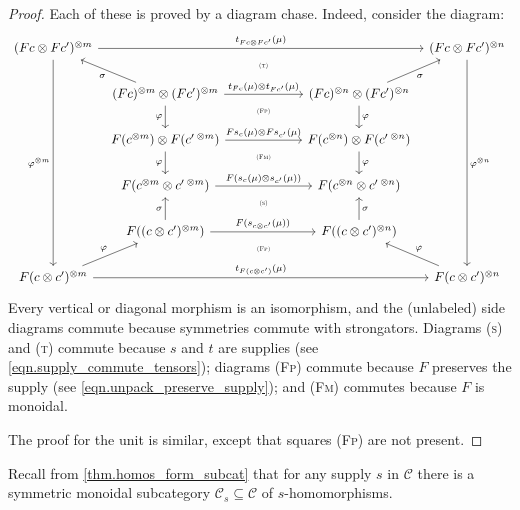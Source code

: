 \documentclass[11pt, oneside, article]{memoir}
\theoremstyle{plain}
\theoremstyle{definition}
\theoremstyle{remark}
\newcommand{\cat}[1]{\mathcal{#1}}%
\newcommand{\tpow}[1]{^{\otimes #1}}
\renewcommand{\ss}{\subseteq}
\begin{document}
\begin{proof}
Each of these is proved by a diagram chase. Indeed, consider the diagram:
\[
\begin{tikzcd}[column sep=6pt]
	(Fc\otimes Fc')\tpow{m}
		\ar[rrrr, "t_{Fc\otimes Fc'}(\mu)"]
		\ar[ddddd, "\varphi\tpow{m}"']
		\ar[from=dr, "\sigma"]&&[18pt]
		\ar[d, phantom, near start,  "\textsc{\tiny (t)}"]&[18pt]&
	(Fc\otimes Fc')\tpow{n}
		\ar[ddddd, "\varphi\tpow{n}"]
		\ar[from=dl, "\sigma"']\\&
	(Fc)\tpow{m}\otimes(Fc')\tpow{m}
		\ar[d, "\varphi"']
		\ar[rr, "t_{Fc}(\mu)\otimes t_{Fc'}(\mu)"]&
		\ar[d, phantom, near start, "\textsc{\tiny (Fp)}"]&
	(Fc)\tpow{n}\otimes(Fc')\tpow{n}
		\ar[d, "\varphi"]\\&
	F(c\tpow{m})\otimes F(c'\,\tpow{m})
		\ar[rr, "Fs_c(\mu)\otimes Fs_{c'}(\mu)"]
		\ar[d, "\varphi"']&
		\ar[d, phantom, near start, "\textsc{\tiny (Fm)}"]&
	F(c\tpow{n})\otimes F(c'\,\tpow{n})
		\ar[d, "\varphi"]\\&
	F(c\tpow{m}\otimes c'\,\tpow{m})
		\ar[rr, "F(s_c(\mu)\otimes s_{c'}(\mu))"]&
		\ar[d, phantom, near start, "\textsc{\tiny (s)}"]&
	F(c\tpow{n}\otimes c'\,\tpow{n})\\&
	F((c\otimes c')\tpow{m})
		\ar[u, "\sigma"]
		\ar[rr, "F(s_{c\otimes c'}(\mu))"]&
		\ar[d, phantom, near start, "\textsc{\tiny (Fp)}"]&
	F((c\otimes c')\tpow{n})
		\ar[u, "\sigma"']\\
	F(c\otimes c')\tpow{m}
		\ar[rrrr, "t_{F(c\otimes c')}(\mu)"]
		\ar[ur, "\varphi"]&&~&&
	F(c\otimes c')\tpow{n}
		\ar[ul, "\varphi"']
\end{tikzcd}
\]
Every vertical or diagonal morphism is an isomorphism, and the (unlabeled) side diagrams commute because symmetries commute with strongators. Diagrams \textsc{(s)} and \textsc{(t)} commute because $s$ and $t$ are supplies (see \cref{eqn.supply_commute_tensors}); diagrams \textsc{(Fp)} commute because $F$ preserves the supply (see \cref{eqn.unpack_preserve_supply}); and \textsc{(Fm)} commutes because $F$ is monoidal.

The proof for the unit is similar, except that squares \textsc{(Fp)} are not present.
\end{proof}

Recall from \cref{thm.homos_form_subcat} that for any supply $s$ in $\cat{C}$ there is a symmetric monoidal subcategory $\cat{C}_s\ss\cat{C}$ of $s$-homomorphisms.
\end{document}
